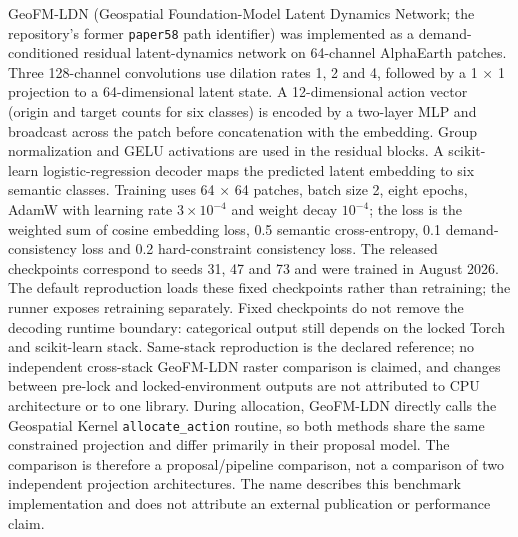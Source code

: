 \documentclass[
]{article}
\begin{document}
GeoFM-LDN (Geospatial Foundation-Model Latent Dynamics Network; the
repository's former \texttt{paper58} path identifier) was implemented as
a demand-conditioned residual latent-dynamics network on 64-channel
AlphaEarth patches. Three 128-channel convolutions use dilation rates 1,
2 and 4, followed by a 1 × 1 projection to a 64-dimensional latent
state. A 12-dimensional action vector (origin and target counts for six
classes) is encoded by a two-layer MLP and broadcast across the patch
before concatenation with the embedding. Group normalization and GELU
activations are used in the residual blocks. A scikit-learn
logistic-regression decoder maps the predicted latent embedding to six
semantic classes. Training uses 64 × 64 patches, batch size 2, eight
epochs, AdamW with learning rate \(3\times10^{-4}\) and weight decay
\(10^{-4}\); the loss is the weighted sum of cosine embedding loss, 0.5
semantic cross-entropy, 0.1 demand-consistency loss and 0.2
hard-constraint consistency loss. The released checkpoints correspond to
seeds 31, 47 and 73 and were trained in August 2026. The default
reproduction loads these fixed checkpoints rather than retraining; the
runner exposes retraining separately. Fixed checkpoints do not remove
the decoding runtime boundary: categorical output still depends on the
locked Torch and scikit-learn stack. Same-stack reproduction is the
declared reference; no independent cross-stack GeoFM-LDN raster
comparison is claimed, and changes between pre-lock and
locked-environment outputs are not attributed to CPU architecture or to
one library. During allocation, GeoFM-LDN directly calls the Geospatial
Kernel \texttt{allocate\_action} routine, so both methods share the same
constrained projection and differ primarily in their proposal model. The
comparison is therefore a proposal/pipeline comparison, not a comparison
of two independent projection architectures. The name describes this
benchmark implementation and does not attribute an external publication
or performance claim.
\end{document}
